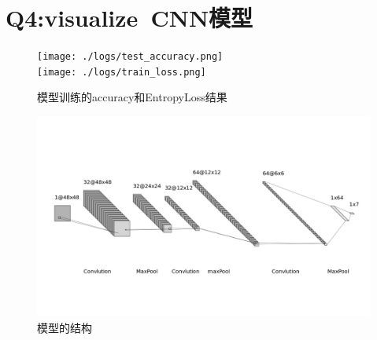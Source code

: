 \documentclass[UTF8]{article}
\begin{document}
    \section{Q4:visualize\ CNN模型}
    \begin{figure}[H]
      \centering
      \texttt{[image: ./logs/test\_accuracy.png]}
      \\[18pt]
      \texttt{[image: ./logs/train\_loss.png]}
      \caption{模型训练的accuracy和EntropyLoss结果}
    \end{figure}
    \begin{figure}[H]
        \centering
        \includegraphics[width = 12cm]{./nn.png}
        \caption{模型的结构}
      \end{figure}
\end{document}
